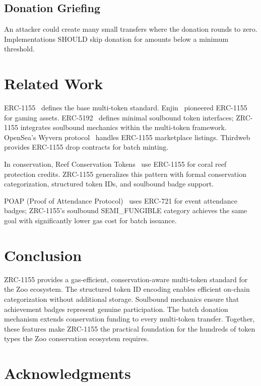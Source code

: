 \documentclass[11pt,letterpaper]{article}
\begin{document}
\subsection{Donation Griefing}

An attacker could create many small transfers where the donation rounds to zero. Implementations SHOULD skip donation for amounts below a minimum threshold.

\section{Related Work}

ERC-1155~\cite{erc1155} defines the base multi-token standard. Enjin~\cite{enjin2019} pioneered ERC-1155 for gaming assets. ERC-5192~\cite{erc5192} defines minimal soulbound token interfaces; ZRC-1155 integrates soulbound mechanics within the multi-token framework. OpenSea's Wyvern protocol~\cite{opensea2018} handles ERC-1155 marketplace listings. Thirdweb~\cite{thirdweb2023} provides ERC-1155 drop contracts for batch minting.

In conservation, Reef Conservation Tokens~\cite{reef2022} use ERC-1155 for coral reef protection credits. ZRC-1155 generalizes this pattern with formal conservation categorization, structured token IDs, and soulbound badge support.

POAP (Proof of Attendance Protocol)~\cite{poap2019} uses ERC-721 for event attendance badges; ZRC-1155's soulbound SEMI\_FUNGIBLE category achieves the same goal with significantly lower gas cost for batch issuance.

\section{Conclusion}

ZRC-1155 provides a gas-efficient, conservation-aware multi-token standard for the Zoo ecosystem. The structured token ID encoding enables efficient on-chain categorization without additional storage. Soulbound mechanics ensure that achievement badges represent genuine participation. The batch donation mechanism extends conservation funding to every multi-token transfer. Together, these features make ZRC-1155 the practical foundation for the hundreds of token types the Zoo conservation ecosystem requires.

\section*{Acknowledgments}
\end{document}
